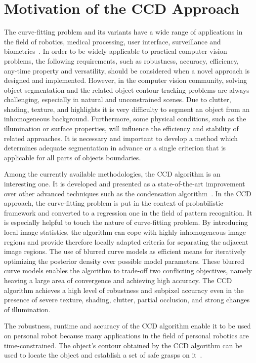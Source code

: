 \section{Motivation of the CCD Approach}
\label{sec:mccd}
The curve-fitting problem and its variants have a wide range of
applications in the field of robotics, medical processing, user
interface, surveillance and biometrics~\cite{hanek2004fitting}. In order to be
widely applicable to practical computer vision problems, the following
requirements, such as robustness,
accuracy, efficiency, any-time property and versatility, should be
considered when a novel approach is designed and implemented.
However, in the computer vision community, solving object segmentation and the
related object contour tracking problems are always challenging,
especially in natural and unconstrained scenes. Due to clutter,
shading, texture, and highlights it is very difficulty to segment
an object from an inhomogeneous background. Furthermore, some physical
conditions, such as the illumination or surface properties, will
influence the efficiency and stability of related approaches. It is
necessary and important to develop a method which determines adequate segmentation
in advance or a single criterion that is applicable
for all parts of objects boundaries.

Among the currently available methodologies, the CCD algorithm is an
interesting one. It is developed and presented as a state-of-the-art
improvement over other advanced techniques such as the condensation
algorithm~\cite{panin2006fully}. In the CCD approach, the curve-fitting problem is
put in the context of probabilistic framework and converted to a
regression one in the field of pattern recognition. It is especially
helpful to touch the nature of curve-fitting problem. By introducing
local image statistics, the algorithm can cope with highly
inhomogeneous image regions and provide therefore locally adapted
criteria for separating the adjacent image regions. The use of blurred
curve models as efficient means for iteratively optimizing the
posterior density over possible model parameters. These blurred curve
models enables the algorithm to trade-off two conflicting objectives,
namely heaving a large area of convergence and achieving high
accuracy. The CCD algorithm achieves a high level of robustness and subpixel
accuracy even in the presence of severe texture, shading, clutter,
partial occlusion, and strong changes of illumination.

The robustness, runtime and accuracy of the CCD algorithm enable it 
to be used on personal robot  because many applications in the field
of personal robotics are time-constrained. The object's contour
obtained by the CCD algorithm can be used to locate the object and
establish a set of safe grasps on it~\cite{hanek2000vision}.




